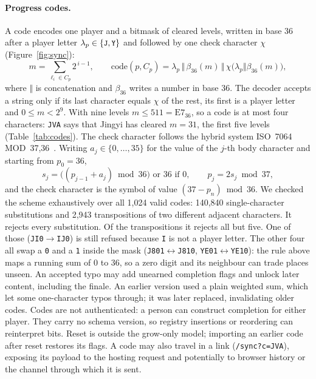 \documentclass[sigconf,nonacm]{acmart}
\newcommand{\code}[1]{\textnormal{\texttt{\small #1}}}
\begin{document}
\paragraph{Progress codes.} A code encodes one player and a bitmask of cleared levels,
written in base 36 after a player letter $\lambda_p \in \{\code{J}, \code{Y}\}$ and followed by one
check character $\chi$ (Figure~\ref{fig:sync}):
\begin{equation}\label{eq:code}
  m = \sum_{\ell_i \in C_p} 2^{\,i-1}, \qquad
  \mathrm{code}(p, C_p) = \lambda_p \,\Vert\, \beta_{36}(m) \,\Vert\, \chi\big(\lambda_p \Vert \beta_{36}(m)\big),
\end{equation}
where $\Vert$ is concatenation and $\beta_{36}$ writes a number in base 36. The decoder accepts a
string only if its last character equals $\chi$ of the rest, its first is a player letter and
$0 \le m < 2^{9}$. With nine levels $m \le 511 = \mathrm{E7}_{36}$, so a
code is at most four characters: \code{JVA} says that Jingyi has cleared $m = 31$, the first five
levels (Table~\ref{tab:codes}). The check character follows the hybrid system ISO~7064
MOD~37,36~\cite{iso7064}. Writing $a_j \in \{0,\dots,35\}$ for the value of the $j$-th body
character and starting from $p_0 = 36$,
\begin{equation}\label{eq:check}
  s_j = \big((p_{j-1} + a_j) \bmod 36\big) \text{ or } 36 \text{ if } 0, \qquad
  p_j = 2 s_j \bmod 37 ,
\end{equation}
and the check character is the symbol of value $(37 - p_n) \bmod 36$. We checked the scheme exhaustively over all
1{,}024 valid codes: 140{,}840 single-character substitutions and 2{,}943 transpositions of two
different adjacent characters. It rejects every substitution. Of the transpositions it rejects
all but five. One of those (\code{JI0}$\to$\code{IJ0}) is still refused because \code{I} is not a
player letter. The other four all swap a \code{0} and a \code{1} inside the mask
(\code{J801}$\leftrightarrow$\code{J810}, \code{YE01}$\leftrightarrow$\code{YE10}): the rule above
maps a running sum of 0 to 36, so a zero digit and its neighbour can trade places unseen.
An accepted typo may add unearned completion flags and unlock later content, including the finale. An earlier version used a plain weighted sum,
which let some one-character typos through; it was later replaced, invalidating older
codes. Codes are not authenticated: a person can construct completion for either player. They
carry no schema version, so registry insertions or reordering can reinterpret bits. Reset is outside
the grow-only model; importing an earlier code after reset restores its flags. A code may also
travel in a link (\code{/sync?c=JVA}), exposing its payload to the hosting request and potentially
to browser history or the channel through which it is sent.
\end{document}
